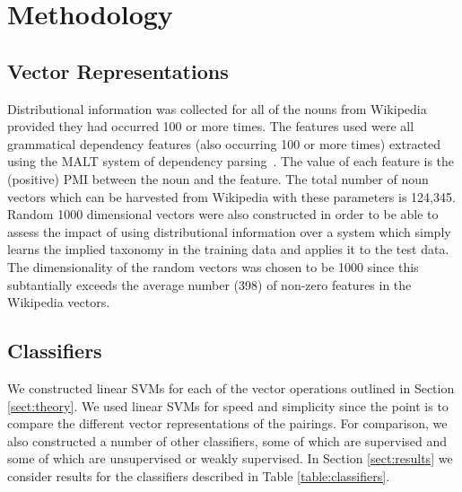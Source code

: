 \documentclass[11pt]{article}
\begin{document}
\section{Methodology}

\subsection{Vector Representations}

Distributional information was collected for all of the nouns from Wikipedia provided they had occurred 100 or more times.  The features used were all grammatical dependency features (also occurring 100 or more times) extracted using the MALT system of dependency parsing~\cite{Nivre2006}.  The value of each feature is the (positive) PMI between the noun and the feature. The total number of noun vectors which can be harvested from Wikipedia with these parameters is 124,345.  Random 1000 dimensional vectors were also constructed in order to be able to assess the impact of using distributional information over a system which simply learns the implied taxonomy in the training data and applies it to the test data.  The dimensionality of the random vectors was chosen to be 1000 since this subtantially exceeds the average number (398) of non-zero features in the Wikipedia vectors.

\subsection{Classifiers}

We constructed linear SVMs for each of the vector operations outlined in Section \ref{sect:theory}.  We used linear SVMs for speed and simplicity since the point is to compare the different vector representations of the pairings.  For comparison, we also constructed a number of other classifiers, some of which are supervised and some of which are unsupervised or weakly supervised.  In Section \ref{sect:results} we consider results for the classifiers described in Table \ref{table:classifiers}.
\end{document}
